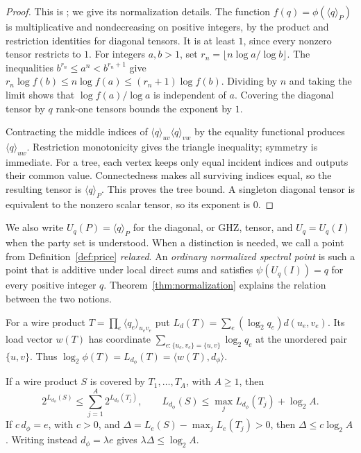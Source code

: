 \begin{proof}
This is \cite[Lemma A.2, p.~19]{Anthropic2026}; we give its
normalization details. The function $f(q)=\phi(\langle q\rangle_P)$
is multiplicative and nondecreasing on positive integers, by the
product and restriction identities for diagonal tensors.
It is at least $1$, since every nonzero tensor restricts to $1$.
For integers $a,b>1$, set $r_n=\lfloor n\log a/\log b\rfloor$.
The inequalities $b^{r_n}\le a^n<b^{r_n+1}$ give
$r_n\log f(b)\le n\log f(a)\le(r_n+1)\log f(b)$.
Dividing by $n$ and taking the limit shows that
$\log f(a)/\log a$ is independent of $a$. Covering the diagonal
tensor by $q$ rank-one tensors bounds the exponent by $1$.

Contracting the middle indices of
$\langle q\rangle_{uv}\langle q\rangle_{vw}$ by the equality
functional produces $\langle q\rangle_{uw}$.
Restriction monotonicity gives the triangle inequality; symmetry
is immediate. For a tree, each vertex keeps only equal incident
indices and outputs their common value. Connectedness makes all
surviving indices equal, so the resulting tensor is
$\langle q\rangle_P$. This proves the tree bound.
A singleton diagonal tensor is equivalent to the nonzero scalar
tensor, so its exponent is $0$.
\end{proof}

We also write $U_q(P)=\langle q\rangle_P$ for the diagonal, or GHZ,
tensor, and $U_q=U_q(I)$ when the party set is understood.
When a distinction is needed, we call a point from
Definition~\ref{def:price} \emph{relaxed}. An \emph{ordinary normalized
spectral point} is such a point that is additive under local direct
sums and satisfies $\psi(U_q(I))=q$ for every positive integer $q$.
Theorem~\ref{thm:normalization} explains the relation between the two
notions.

For a wire product $T=\prod_e\langle q_e\rangle_{u_ev_e}$ put
$L_d(T)=\sum_e(\log_2q_e)d(u_e,v_e)$. Its load vector $w(T)$
has coordinate $\sum_{e:\{u_e,v_e\}=\{u,v\}}\log_2q_e$
at the unordered pair $\{u,v\}$.
Thus $\log_2\phi(T)=L_{d_\phi}(T)=\langle w(T),d_\phi\rangle$.

\begin{proposition}\label{prop:cover}
If a wire product $S$ is covered by $T_1,\ldots,T_A$, with $A\ge1$,
then
\[
 2^{L_{d_\phi}(S)}\le\sum_{j=1}^A2^{L_{d_\phi}(T_j)},\qquad
 L_{d_\phi}(S)\le\max_j L_{d_\phi}(T_j)+\log_2A.
\]
If $c\,d_\phi=e$, with $c>0$, and
$\Delta=L_e(S)-\max_jL_e(T_j)>0$, then
$\Delta\le c\log_2A$.
Writing instead $d_\phi=\lambda e$ gives
$\lambda\Delta\le\log_2A$.
\end{proposition}

